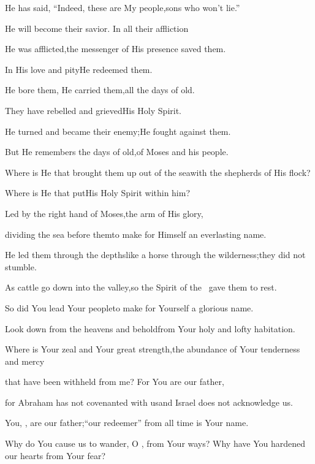 \begin{inparaenum}
  \pa{} He has said, ``Indeed, these are My people,\pa{}sons who won't lie.''%

  \pb{}He will become their savior.  In all their affliction%

  \pb{}He was afflicted,\pa{}the messenger of His presence saved them.%

  \pb{}In His love and pity\pa{}He redeemed them.%

  \pb{}He bore them, He carried them,\pa{}all the days of old.%

  \pa{} They have rebelled and grieved\pa{}His Holy Spirit.%

  \pb{}He turned and became their enemy;\pa{}He fought against them.%

  \pb{} But He remembers the days of old,\pa{}of Moses and his people.%

  \pb{}Where is He that brought them up out of the sea\pa{}with the shepherds of His flock?%

  \pb{}Where is He that put\pa{}His Holy Spirit within him?%

  \pa{} Led by the right hand of Moses,\pa{}the arm of His glory,%

  \pb{}dividing the sea before them\pa{}to make for Himself an everlasting name.%

  \pa{} He led them through the depths\pa{}like a horse through the wilderness;\pa{}they did not stumble.%

  \pa{} As cattle go down into the valley,\pa{}so the Spirit of the \lord\ gave them to rest.%

  \pb{}So did You lead Your people\pa{}to make for Yourself a glorious name.%

  \pb{} Look down from the heavens and behold\pa{}from Your holy and lofty habitation.%

  \pc{}Where is Your zeal and Your great strength,\pa{}the abundance of Your tenderness and mercy%

  \pd{}that have been withheld from me?  For You are our father,%

  \pc{}for Abraham has not covenanted with us\pa{}and Israel does not acknowledge us.%

  \pc{}You, \lord, are our father;\pa{}``our redeemer'' from all time is Your name.%

  \pb{} Why do You cause us to wander, O \lord, from Your ways?%
  \pa{}Why have You hardened our hearts from Your fear?%
\end{inparaenum}
